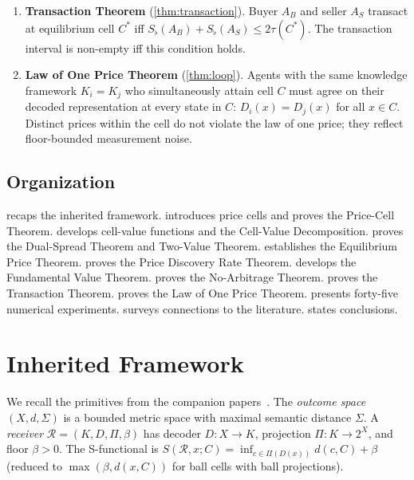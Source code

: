 \documentclass[twocolumn,11pt,a4paper]{article}
\theoremstyle{remark}
\newcommand{\Sflat}{S_{\flat}}
\newcommand{\Rec}{\mathcal{R}}
\newcommand{\tol}{\tau}
\begin{document}
\begin{enumerate}[leftmargin=*, label=\textbf{(\roman*)}]
\item \textbf{Transaction Theorem}
  (\cref{thm:transaction}).
  Buyer $A_B$ and seller $A_S$ transact at equilibrium cell $C^*$ iff
  $\Sflat(A_B) + \Sflat(A_S) \le 2\tol(C^*)$.  The transaction interval
  is non-empty iff this condition holds.

\item \textbf{Law of One Price Theorem}
  (\cref{thm:loop}).
  Agents with the same knowledge framework $K_i = K_j$ who simultaneously
  attain cell $C$ must agree on their decoded representation at every state
  in $C$: $D_i(x) = D_j(x)$ for all $x \in C$.  Distinct prices within
  the cell do not violate the law of one price; they reflect floor-bounded
  measurement noise.
\end{enumerate}

\subsection{Organization}
\label{sec:intro:org}

 recaps the inherited framework.
 introduces price cells and proves the Price-Cell
Theorem.
 develops cell-value functions and the Cell-Value
Decomposition.
 proves the Dual-Spread Theorem and Two-Value Theorem.
 establishes the Equilibrium Price Theorem.
 proves the Price Discovery Rate Theorem.
 develops the Fundamental Value Theorem.
 proves the No-Arbitrage Theorem.
 proves the Transaction Theorem.
 proves the Law of One Price Theorem.
 presents forty-five numerical experiments.
 surveys connections to the literature.
 states conclusions.

\section{Inherited Framework}
\label{sec:prelim}

We recall the primitives from the companion
papers~\cite{sachikonye2025agents,sachikonye2025market,sachikonye2025het}.
The \emph{outcome space} $(X, d, \Sigma)$ is a bounded metric space with
maximal semantic distance $\Sigma$.  A \emph{receiver} $\Rec = (K, D, \Pi,
\beta)$ has decoder $D: X \to K$, projection $\Pi: K \to 2^X$, and floor
$\beta > 0$.  The S-functional is $S(\Rec, x; C) = \inf_{c \in \Pi(D(x))}
d(c, C) + \beta$ (reduced to $\max(\beta, d(x, C))$ for ball cells with ball
projections).
\end{document}
